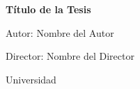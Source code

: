 \documentclass[12pt, a4paper]{report}
\begin{document}
\begin{titlepage}
    \centering
    \vspace*{2cm}
    {\LARGE\bfseries Título de la Tesis\par}
    \vspace{1.5cm}
    {\large Autor: Nombre del Autor\par}
    \vspace{1cm}
    {\large Director: Nombre del Director\par}
    \vfill
    {\large Universidad\par}
    {\large \the\year\par}
\end{titlepage}

\tableofcontents
\listoffigures
\listoftables






\printbibliography
\end{document}
